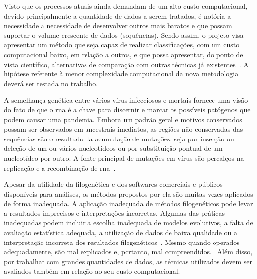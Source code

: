 Visto que os processos atuais ainda demandam de um alto custo computacional, devido principalmente a quantidade de dados a serem tratados, é notória a necessidade a necessidade de desenvolver outros mais baratos e que possam suportar o volume crescente de dados (sequências).
Sendo assim, o projeto visa apresentar um método que seja capaz de realizar classificações, com um custo computacional baixo, em relação a outros, e que possa apresentar, do ponto de vista científico, alternativas de comparação com outras técnicas já existentes~\cite{frank_chemistry_2017,gene_brow_2020}. A hipótese referente à menor complexidade computacional da nova metodologia deverá ser testada no trabalho.

A semelhança genética entre vários vírus infecciosos e mortais fornece uma visão do fato de que o \gls{rna} é a chave para discernir e marcar os possíveis patógenos que podem causar uma pandemia. Embora um padrão geral e motivos conservados possam ser observados em ancestrais imediatos, as regiões não conservadas das sequências são o resultado da acumulação de mutações, seja por inserção ou deleção de um ou vários nucleotídeos ou por substituição pontual de um nucleotídeo por outro. A fonte principal de mutações em vírus são percalços na replicação e a recombinação de \gls{rna}~\cite{behl_threat_2022}.

Apesar da utilidade da filogenética e dos softwares comerciais e públicos disponíveis para análises, os métodos propostos por ela são muitas vezes aplicados de forma inadequada. A aplicação inadequada de métodos filogenéticos pode levar a resultados imprecisos e interpretações incorretas. Algumas das práticas inadequadas podem incluir a escolha inadequada de modelos evolutivos, a falta de avaliação estatística adequada, a utilização de dados de baixa qualidade ou a interpretação incorreta dos resultados filogenéticos~\cite{felsenstein_inferring_2004,mrbayes_huelsenbeck_2001}. Mesmo quando operados adequadamente, são mal explicados e, portanto, mal compreendidos.~\cite[p. 1]{barry_phylogenetic_analysis_2006} Além disso, por trabalhar com grandes quantidades de dados, as técnicas utilizados devem ser avaliados também em relação ao seu custo computacional.


